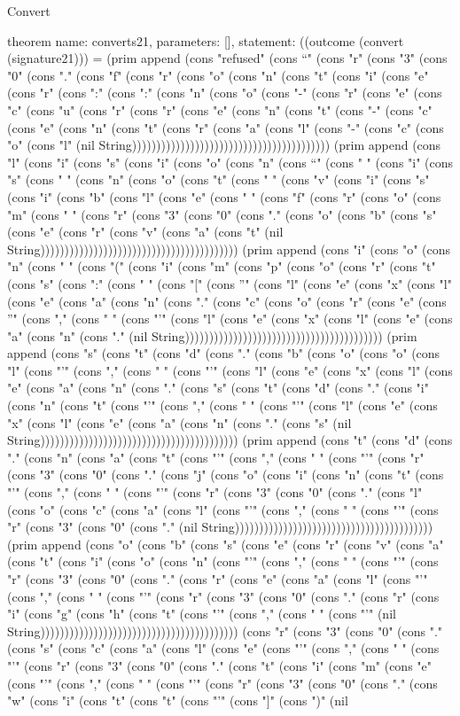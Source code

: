 \begin{lexlean}{Convert}
\begin{semanticmodule}
theorem{
  name: converts21,
  parameters: [],
  statement: ((outcome (convert (signature21))) = (prim append (cons "refused" (cons "`" (cons "r" (cons "3" (cons "0" (cons "." (cons "f" (cons "r" (cons "o" (cons "n" (cons "t" (cons "i" (cons "e" (cons "r" (cons ":" (cons ":" (cons "n" (cons "o" (cons "-" (cons "r" (cons "e" (cons "c" (cons "u" (cons "r" (cons "r" (cons "e" (cons "n" (cons "t" (cons "-" (cons "c" (cons "e" (cons "n" (cons "t" (cons "r" (cons "a" (cons "l" (cons "-" (cons "c" (cons "o" (cons "l" (nil String))))))))))))))))))))))))))))))))))))))))) (prim append (cons "l" (cons "i" (cons "s" (cons "i" (cons "o" (cons "n" (cons "`" (cons " " (cons "i" (cons "s" (cons " " (cons "n" (cons "o" (cons "t" (cons " " (cons "v" (cons "i" (cons "s" (cons "i" (cons "b" (cons "l" (cons "e" (cons " " (cons "f" (cons "r" (cons "o" (cons "m" (cons " " (cons "r" (cons "3" (cons "0" (cons "." (cons "o" (cons "b" (cons "s" (cons "e" (cons "r" (cons "v" (cons "a" (cons "t" (nil String))))))))))))))))))))))))))))))))))))))))) (prim append (cons "i" (cons "o" (cons "n" (cons " " (cons "(" (cons "i" (cons "m" (cons "p" (cons "o" (cons "r" (cons "t" (cons "s" (cons ":" (cons " " (cons "[" (cons "'" (cons "l" (cons "e" (cons "x" (cons "l" (cons "e" (cons "a" (cons "n" (cons "." (cons "c" (cons "o" (cons "r" (cons "e" (cons "'" (cons "," (cons " " (cons "'" (cons "l" (cons "e" (cons "x" (cons "l" (cons "e" (cons "a" (cons "n" (cons "." (nil String))))))))))))))))))))))))))))))))))))))))) (prim append (cons "s" (cons "t" (cons "d" (cons "." (cons "b" (cons "o" (cons "o" (cons "l" (cons "'" (cons "," (cons " " (cons "'" (cons "l" (cons "e" (cons "x" (cons "l" (cons "e" (cons "a" (cons "n" (cons "." (cons "s" (cons "t" (cons "d" (cons "." (cons "i" (cons "n" (cons "t" (cons "'" (cons "," (cons " " (cons "'" (cons "l" (cons "e" (cons "x" (cons "l" (cons "e" (cons "a" (cons "n" (cons "." (cons "s" (nil String))))))))))))))))))))))))))))))))))))))))) (prim append (cons "t" (cons "d" (cons "." (cons "n" (cons "a" (cons "t" (cons "'" (cons "," (cons " " (cons "'" (cons "r" (cons "3" (cons "0" (cons "." (cons "j" (cons "o" (cons "i" (cons "n" (cons "t" (cons "'" (cons "," (cons " " (cons "'" (cons "r" (cons "3" (cons "0" (cons "." (cons "l" (cons "o" (cons "c" (cons "a" (cons "l" (cons "'" (cons "," (cons " " (cons "'" (cons "r" (cons "3" (cons "0" (cons "." (nil String))))))))))))))))))))))))))))))))))))))))) (prim append (cons "o" (cons "b" (cons "s" (cons "e" (cons "r" (cons "v" (cons "a" (cons "t" (cons "i" (cons "o" (cons "n" (cons "'" (cons "," (cons " " (cons "'" (cons "r" (cons "3" (cons "0" (cons "." (cons "r" (cons "e" (cons "a" (cons "l" (cons "'" (cons "," (cons " " (cons "'" (cons "r" (cons "3" (cons "0" (cons "." (cons "r" (cons "i" (cons "g" (cons "h" (cons "t" (cons "'" (cons "," (cons " " (cons "'" (nil String))))))))))))))))))))))))))))))))))))))))) (cons "r" (cons "3" (cons "0" (cons "." (cons "s" (cons "c" (cons "a" (cons "l" (cons "e" (cons "'" (cons "," (cons " " (cons "'" (cons "r" (cons "3" (cons "0" (cons "." (cons "t" (cons "i" (cons "m" (cons "e" (cons "'" (cons "," (cons " " (cons "'" (cons "r" (cons "3" (cons "0" (cons "." (cons "w" (cons "i" (cons "t" (cons "t" (cons "'" (cons "]" (cons ")" (nil }
\end{semanticmodule}
\end{lexlean}
